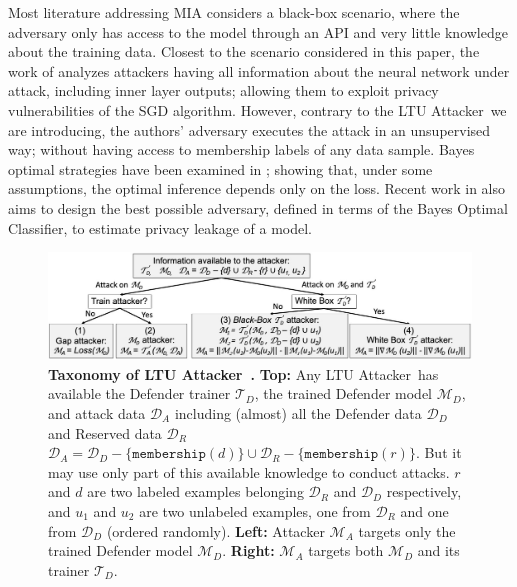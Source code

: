 \documentclass[letterpaper]{article}
\newcommand{\sminus}{-}
\newcommand{\oracle}{LTU Attacker~}
\begin{document}
Most literature addressing MIA considers a black-box scenario, where the adversary only has access to the model through an API and very little knowledge about the training data. Closest to the scenario considered in this paper, the work of \cite{nasr2019comprehensive} analyzes attackers having all information about the neural network under attack, including inner layer outputs; allowing them to exploit privacy vulnerabilities of the SGD algorithm. However, contrary to the \oracle we are introducing, the authors' adversary executes the attack in an unsupervised way; without having access to  membership labels of any data sample. Bayes optimal strategies have been examined in \cite{sablayrolles2019white}; showing that, under some assumptions, the optimal inference depends only on the loss. Recent work in \cite{liu2020mace} also aims to design the best possible adversary, defined in terms of the Bayes Optimal Classifier, to estimate privacy leakage of a model.

   
\begin{figure}[t]
    \centering
    \includegraphics[width=\textwidth]{Figures/Taxonomy.jpg}
    \caption{\label{fig:taxonomy} {\bf Taxonomy of \oracle.} {\bf Top:} Any \oracle has available the Defender trainer $\mathcal{T}_D$, the trained Defender model $\mathcal{M}_D$, and attack data $\mathcal{D}_A$ including (almost) all the Defender data $\mathcal{D}_D$ and Reserved data $\mathcal{D}_R$ $\mathcal{D}_A=\mathcal{D}_D\sminus\{\texttt{membership}(d)\} \cup \mathcal{D}_R\sminus\{\texttt{membership}(r)\}$. But it may use only part of this available knowledge to conduct attacks. $r$ and $d$ are two labeled examples belonging $\mathcal{D}_R$  and $\mathcal{D}_D$ respectively, and $u_1$ and $u_2$ are two unlabeled examples, one from $\mathcal{D}_R$ and one from $\mathcal{D}_D$ (ordered randomly). {\bf Left:} Attacker $\mathcal{M}_A$ targets only the trained Defender model $\mathcal{M}_D$. {\bf Right:} $\mathcal{M}_A$ targets both $\mathcal{M}_D$ and its trainer $\mathcal{T}_D$.}
\end{figure}
\end{document}
